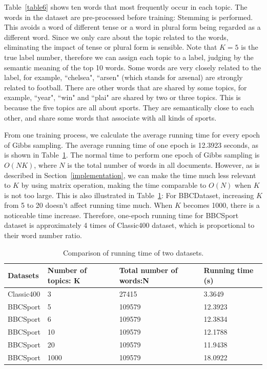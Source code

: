 \documentclass{article} %
\begin{document}
\par
Table~\ref{table6} shows ten words that most frequently occur in each topic. The words in the dataset are pre-processed before training: Stemming is performed. This avoids a word of different tense or a word in plural form being regarded as a different word. Since we only care about the topic related to the words, eliminating the impact of tense or plural form is sensible. Note that $K=5$ is the true label number, therefore we can assign each topic to a label, judging by the semantic meaning of the top 10 words. Some words are very closely related to the label, for example, ``chelsea", ``arsen" (which stands for arsenal) are strongly related to football. There are other words that are shared by some topics, for example, ``year", ``win" and ``plai" are shared by two or three topics. This is because the five topics are all about sports. They are semantically close to each other, and share some words that associate with all kinds of sports.
\par
From one training process, we calculate the average running time for every epoch of Gibbs sampling. The average running time of one epoch is 12.3923 seconds, as is shown in Table~\ref{table7}. The normal time to perform one epoch of Gibbs sampling is $O(NK)$, where $N$ is the total number of words in all documents. However, as is described in Section~\ref{implementation}, we can make the time much less relevant to $K$ by using matrix operation, making the time comparable to $O(N)$ when $K$ is not too large. This is also illustrated in Table~\ref{table7}: For BBCDataset, increasing $K$ from 5 to 20 doesn't affect running time much. When $K$ becomes 1000, there is a noticeable time increase. Therefore, one-epoch running time for BBCSport dataset is approximately 4 times of Classic400 dataset, which is proportional to their word number ratio. 
\begin{table}
\centering
    \begin{tabular}{|l|l|l|l|}
    \hline
    Datasets   & Number of topics: K & Total number of words:N & Running time (s) \\ \hline
    Classic400 & 3                   & 27415                   & 3.3649           \\ \hline
    BBCSport   & 5                   & 109579                  & 12.3923          \\ \hline
    BBCSport   & 6                   & 109579                  & 12.3834          \\ \hline
    BBCSport   & 10                  & 109579                  & 12.1788          \\ \hline
    BBCSport   & 20                  & 109579                  & 11.9438                \\ \hline
    BBCSport   & 1000                 & 109579                  & 18.0922          \\ \hline
    \end{tabular}
    \caption{Comparison of running time of two datasets.}
    \label{table7}
\end{table}
\end{document}

